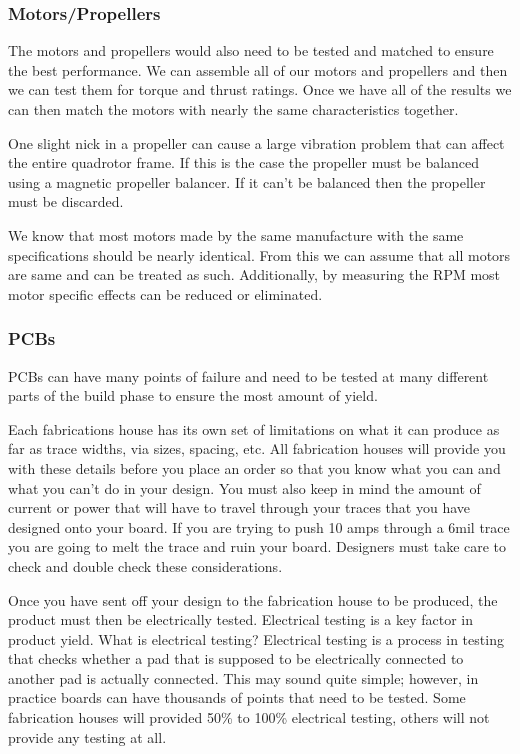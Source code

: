 \documentclass{article}
\numberwithin{equation}{section} %
\begin{document}
\subsubsection{Motors/Propellers}
The motors and propellers would also need to be tested and matched to ensure the best performance. We can assemble all of our motors and propellers and then we can test them for torque and thrust ratings. Once we have all of the results we can then match the motors with nearly the same characteristics together.

One slight nick in a propeller can cause a large vibration problem that can affect the entire quadrotor frame. If this is the case the propeller must be balanced using a magnetic propeller balancer. If it can't be balanced then the propeller must be discarded.

We know that most motors made by the same manufacture with the same specifications should be nearly identical. From this we can assume that all motors are same and can be treated as such. Additionally, by measuring the RPM most motor specific effects can be reduced or eliminated.

\subsubsection{PCBs}
PCBs can have many points of failure and need to be tested at many different parts of the build phase to ensure the most amount of yield. 

Each fabrications house has its own set of limitations on what it can produce as far as trace widths, via sizes, spacing, etc. All fabrication houses will provide you with these details before you place an order so that you know what you can and what you can't do in your design. You must also keep in mind the amount of current  or power that will have to travel through your traces that you have designed onto your board. If you are trying to push 10 amps through a 6mil trace you are going to melt the trace and ruin your board. Designers must take care to check and double check these considerations. 

Once you have sent off your design to the fabrication house to be produced, the product must then be electrically tested. Electrical testing is a key factor in product yield. What is electrical testing? Electrical testing is a process in testing that checks whether a pad that is supposed to be electrically connected to another pad is actually connected. This may sound quite simple; however, in practice boards can have thousands of points that need to be tested. Some fabrication houses will provided 50\% to 100\% electrical testing, others will not provide any testing at all. 
\end{document}
